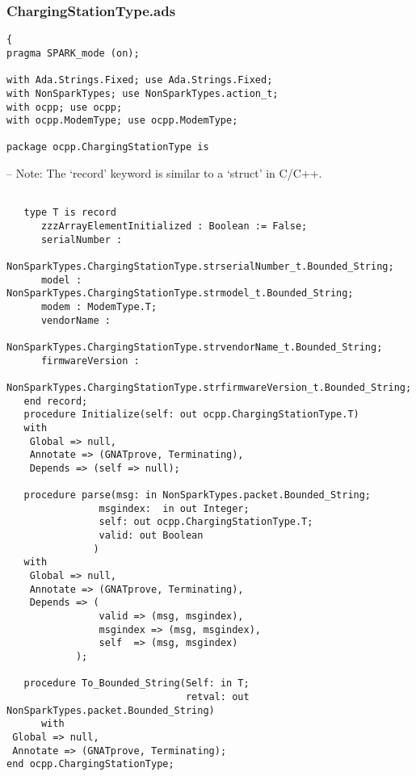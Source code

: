 \documentclass[12pt,openany,a4paper]{book}
\begin{document}
\subsubsection{ChargingStationType.ads}
\begin{verbatim}
{
pragma SPARK_mode (on); 

with Ada.Strings.Fixed; use Ada.Strings.Fixed;
with NonSparkTypes; use NonSparkTypes.action_t; 
with ocpp; use ocpp;
with ocpp.ModemType; use ocpp.ModemType;

package ocpp.ChargingStationType is
\end{verbatim} 
-- Note: The `record' keyword is similar to a `struct' in C/C++.
\begin{verbatim}

   type T is record
      zzzArrayElementInitialized : Boolean := False;
      serialNumber : 
         NonSparkTypes.ChargingStationType.strserialNumber_t.Bounded_String;
      model : NonSparkTypes.ChargingStationType.strmodel_t.Bounded_String;
      modem : ModemType.T;
      vendorName : 
         NonSparkTypes.ChargingStationType.strvendorName_t.Bounded_String;
      firmwareVersion : 
         NonSparkTypes.ChargingStationType.strfirmwareVersion_t.Bounded_String;
   end record;
   procedure Initialize(self: out ocpp.ChargingStationType.T)
   with
    Global => null,
    Annotate => (GNATprove, Terminating),
    Depends => (self => null);

   procedure parse(msg: in NonSparkTypes.packet.Bounded_String;
                msgindex:  in out Integer;
                self: out ocpp.ChargingStationType.T;
                valid: out Boolean
               )
   with
    Global => null,
    Annotate => (GNATprove, Terminating),
    Depends => (
                valid => (msg, msgindex),
                msgindex => (msg, msgindex),
                self  => (msg, msgindex)
            );

   procedure To_Bounded_String(Self: in T;
                               retval: out NonSparkTypes.packet.Bounded_String)
      with
 Global => null,
 Annotate => (GNATprove, Terminating);
end ocpp.ChargingStationType;\end{verbatim}
\end{document}
